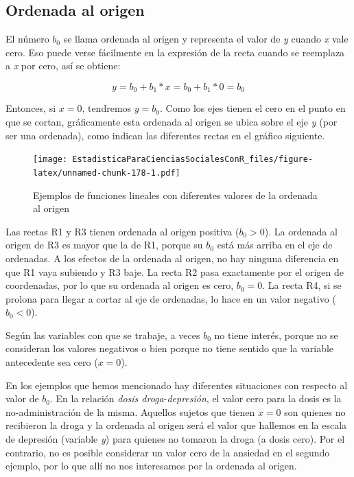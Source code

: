 \documentclass[]{book}
\begin{document}
\hypertarget{ordenada-al-origen}{%
\subsection{Ordenada al origen}\label{ordenada-al-origen}}

El número \(b_{0}\) se llama ordenada al origen y representa el valor de
\emph{y} cuando \emph{x} vale cero. Eso puede verse fácilmente en la expresión de
la recta cuando se reemplaza a \emph{x} por cero, así se obtiene:

\[y = b_{0} + b_{1}*x = b_{0} + b_{1}*0 = b_{0}\]

Entonces, si \(x = 0\), tendremos \(y = b_0\). Como los ejes
tienen el cero en el punto en que se cortan, gráficamente esta ordenada
al origen se ubica sobre el eje \emph{y} (por ser una ordenada), como indican
las diferentes rectas en el gráfico siguiente.

\begin{figure}
\centering
\texttt{[image: EstadisticaParaCienciasSocialesConR\_files/figure-latex/unnamed-chunk-178-1.pdf]}
\caption{\label{fig:unnamed-chunk-178}Ejemplos de funciones lineales con diferentes valores de la ordenada al origen}
\end{figure}

Las rectas R1 y R3 tienen ordenada al origen positiva (\(b_{0} > 0\)). La ordenada al origen de R3 es mayor que la de R1, porque su \(b_{0}\) está más arriba en el eje de ordenadas. A los efectos de la ordenada al origen, no hay ninguna diferencia en que R1 vaya subiendo y R3 baje. La recta R2 pasa exactamente por el origen de coordenadas, por lo que su ordenada al origen es cero, \(b_{0} = 0\). La recta R4, si se prolona para llegar a cortar al eje de ordenadas, lo hace en un valor negativo (\(b_{0} < 0\)).

Según las variables con que se trabaje, a veces \(b_{0}\) no tiene
interés, porque no se consideran los valores negativos o bien porque no tiene sentido que la variable antecedente sea cero (\(x=0\)).

En los ejemplos que hemos mencionado hay diferentes situaciones con
respecto al valor de \(b_{0}\). En la relación \emph{dosis droga}-\emph{depresión}, el valor cero para la dosis es la no-administración de la misma. Aquellos sujetos que tienen \(x = 0\) son quienes no recibieron la droga y
la ordenada al origen será el valor que hallemos en la escala de
depresión (variable \emph{y}) para quienes no tomaron la droga (a dosis
cero). Por el contrario, no es posible considerar un valor cero de la
ansiedad en el segundo ejemplo, por lo que allí no nos interesamos por la ordenada al origen.
\end{document}
